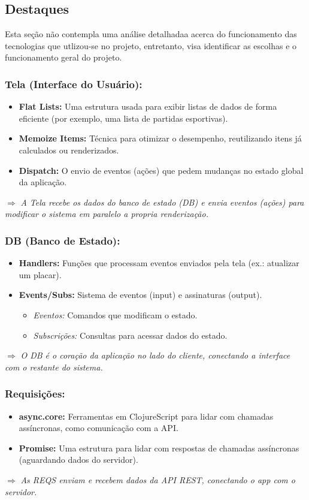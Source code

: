 \documentclass[a4paper,times,12pt]{article}
\begin{document}
\subsection{Destaques}
\hspace{+15pt}
Esta seção não contempla uma análise detalhadaa acerca do funcionamento das tecnologias que utlizou-se no projeto, entretanto, visa identificar as escolhas e o funcionamento geral do projeto. 

\subsubsection{Tela (Interface do Usuário):}
\begin{itemize}
  \item \textbf{Flat Lists:} Uma estrutura usada para exibir listas de dados de forma eficiente (por exemplo, uma lista de partidas esportivas).
  \item \textbf{Memoize Items:} Técnica para otimizar o desempenho, reutilizando itens já calculados ou renderizados.
  \item \textbf{Dispatch:} O envio de eventos (ações) que pedem mudanças no estado global da aplicação.
\end{itemize}
\noindent
\(\Rightarrow\) \textit{A Tela recebe os dados do banco de estado (DB) e envia eventos (ações) para modificar o sistema em paralelo a propria renderização.}

\subsubsection{DB (Banco de Estado):}
\begin{itemize}
  \item \textbf{Handlers:} Funções que processam eventos enviados pela tela (ex.: atualizar um placar).
  \item \textbf{Events/Subs:} Sistema de eventos (input) e assinaturas (output).
    \begin{itemize}
      \item \textit{Eventos:} Comandos que modificam o estado.
      \item \textit{Subscrições:} Consultas para acessar dados do estado.
    \end{itemize}
\end{itemize}
\noindent
\(\Rightarrow\) \textit{O DB é o coração da aplicação no lado do cliente, conectando a interface com o restante do sistema.}

\subsubsection{Requisições:}
\begin{itemize}
  \item \textbf{async.core:} Ferramentas em ClojureScript para lidar com chamadas assíncronas, como comunicação com a API.
  \item \textbf{Promise:} Uma estrutura para lidar com respostas de chamadas assíncronas (aguardando dados do servidor).
\end{itemize}
\noindent
\(\Rightarrow\) \textit{As REQS enviam e recebem dados da API REST, conectando o app com o servidor.}
\end{document}
